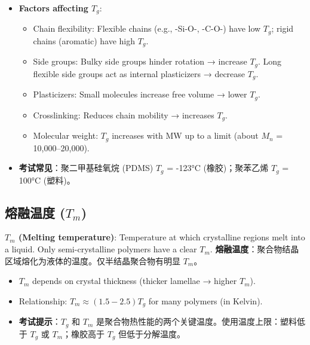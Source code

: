 \documentclass[12pt,a4paper]{ctexart}
\begin{document}
\begin{itemize}
    \item \textbf{Factors affecting $T_g$}:
    \begin{itemize}
        \item Chain flexibility: Flexible chains (e.g., -Si-O-, -C-O-) have low $T_g$; rigid chains (aromatic) have high $T_g$.
        \item Side groups: Bulky side groups hinder rotation → increase $T_g$. Long flexible side groups act as internal plasticizers → decrease $T_g$.
        \item Plasticizers: Small molecules increase free volume → lower $T_g$.
        \item Crosslinking: Reduces chain mobility → increases $T_g$.
        \item Molecular weight: $T_g$ increases with MW up to a limit (about $M_n$ = 10,000–20,000).
    \end{itemize}
    \item \textbf{考试常见}：聚二甲基硅氧烷 (PDMS) $T_g$ = -123°C (橡胶)；聚苯乙烯 $T_g$ = 100°C (塑料)。
\end{itemize}

\subsection{熔融温度 ($T_m$)}
\textbf{$T_m$ (Melting temperature)}: Temperature at which crystalline regions melt into a liquid. Only semi-crystalline polymers have a clear $T_m$.  
\textbf{熔融温度}：聚合物结晶区域熔化为液体的温度。仅半结晶聚合物有明显 $T_m$。

\begin{itemize}
    \item $T_m$ depends on crystal thickness (thicker lamellae → higher $T_m$).
    \item Relationship: $T_m \approx (1.5 - 2.5) T_g$ for many polymers (in Kelvin).
    \item \textbf{考试提示}：$T_g$ 和 $T_m$ 是聚合物热性能的两个关键温度。使用温度上限：塑料低于 $T_g$ 或 $T_m$；橡胶高于 $T_g$ 但低于分解温度。
\end{itemize}
\end{document}
